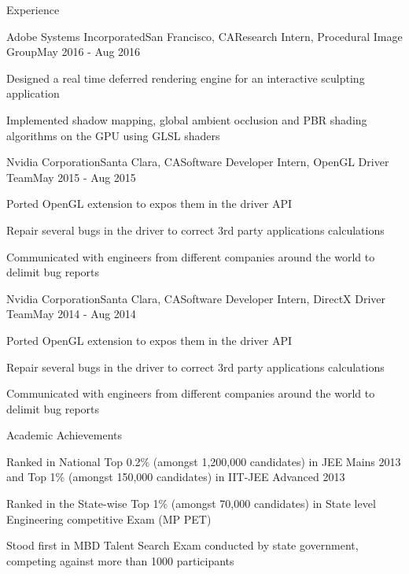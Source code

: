 \documentclass{resume} %
\begin{document}
\begin{rSection}{Experience}

\begin{rSubsection}{Adobe Systems Incorporated}{San Francisco, CA}{Research Intern, Procedural Image Group}{May 2016 - Aug 2016}
\item Designed a real time deferred rendering engine for an interactive sculpting application
\item Implemented shadow mapping, global ambient occlusion and PBR shading algorithms on the GPU using GLSL shaders
\end{rSubsection}

\begin{rSubsection}{Nvidia Corporation}{Santa Clara, CA}{Software Developer Intern, OpenGL Driver Team}{May 2015 - Aug 2015}
\item Ported OpenGL extension to expos them in the driver API
\item Repair several bugs in the driver to correct 3rd party applications calculations
\item Communicated with engineers from different companies around the world to delimit bug reports
\end{rSubsection}

\begin{rSubsection}{Nvidia Corporation}{Santa Clara, CA}{Software Developer Intern, DirectX Driver Team}{May 2014 - Aug 2014}
\item Ported OpenGL extension to expos them in the driver API
\item Repair several bugs in the driver to correct 3rd party applications calculations
\item Communicated with engineers from different companies around the world to delimit bug reports
\end{rSubsection}


\end{rSection}


\begin{rSection}{Academic Achievements} \itemsep -2pt
\item Ranked in National Top 0.2\% (amongst 1,200,000 candidates) in JEE Mains 2013 and Top 1\% (amongst 150,000 candidates) in IIT-JEE Advanced 2013
\item Ranked in the State-wise Top 1\% (amongst 70,000 candidates) in State level Engineering competitive Exam (MP PET)
\item Stood first in MBD Talent Search Exam conducted by state government, competing against more than 1000 participants  
\end{rSection}
\end{document}
